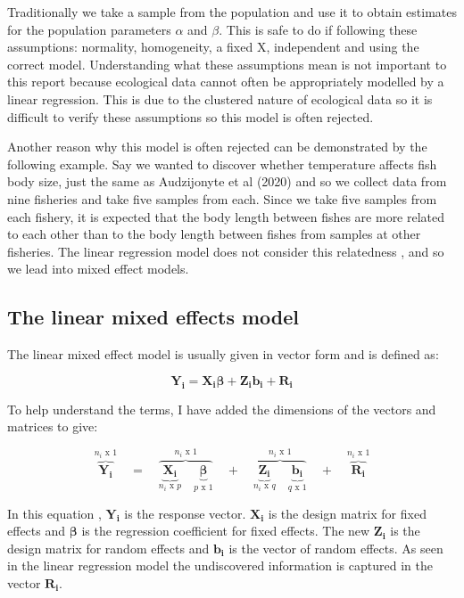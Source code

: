 \documentclass{article}
\begin{document}
Traditionally we take a sample from the population and use it to obtain estimates for the population parameters $\alpha$ and $\beta$. This is safe to do if following these assumptions: normality, homogeneity, a fixed X, independent and using the correct model. Understanding what these assumptions mean is not important to this report because ecological data cannot often be appropriately modelled by a linear regression. This is due to the clustered nature of ecological data so it is difficult to verify these assumptions so this model is often rejected.

Another reason why this model is often rejected can be demonstrated by the following example. Say we wanted to discover whether temperature affects fish body size, just the same as Audzijonyte et al (2020) and so we collect data from nine fisheries and take five samples from each. Since we take five samples from each fishery, it is expected that the body length between fishes are more related to each other than to the body length between fishes from samples at other fisheries. The linear regression model does not consider this relatedness \cite{13}, and so we lead into mixed effect models. 

\subsection{The linear mixed effects model}

The linear mixed effect model is usually given in vector form and is defined as:

\[
\mathbf{Y_i} =
\mathbf{X_i {\boldsymbol\beta}} + 
\mathbf{Z_i b_i} + 
\mathbf{R_i}
\]

To help understand the terms, I have added the dimensions of the vectors and matrices to give:

\[
\overbrace{\mathbf{Y_i}}^{\mbox{$n_i$ x 1}}
\quad = \quad
\overbrace{\underbrace{\mathbf{X_i}}_{\mbox{$n_i$ x $p$}} \quad
\underbrace{\boldsymbol{\beta}}_{\mbox{$p$ x 1}}}^{\mbox{$n_i$ x 1}} 
\quad + \quad
\overbrace{\underbrace{\mathbf{Z_i}}_{\mbox{$n_i$ x $q$}} \quad
\underbrace{\mathbf{b_i}}_{\mbox{$q$ x 1}}}^{\mbox{$n_i$ x 1}}
\quad + \quad
\overbrace{\mathbf{R_i}}^{\mbox{$n_i$ x 1}}
\]

In this equation \cite{14}, $\mathbf{Y_i}$ is the response vector. $\mathbf{X_i}$ is the design matrix for fixed effects and $\boldsymbol{\beta}$ is the regression coefficient for fixed effects. The new $\mathbf{Z_i}$ is the design matrix for random effects and $\mathbf{b_i}$ is the vector of random effects. As seen in the linear regression model the undiscovered information is captured in the vector $\mathbf{R_i}$.
\end{document}
